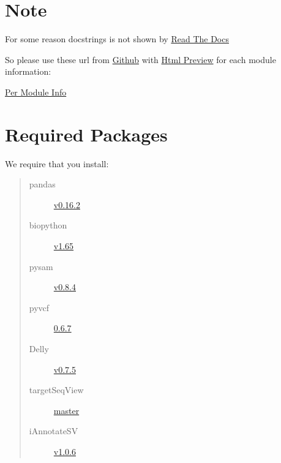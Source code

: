\documentclass[letterpaper,10pt,english]{sphinxmanual}
\begin{document}
\section{Note}
\label{iCallSV:note}
For some reason docstrings is not shown by \href{https:read-the-docs.readthedocs.io}{Read The Docs}

So please use these url from \href{https:github.com}{Github} with \href{https://htmlpreview.github.io/}{Html Preview} for each module information:

\href{https://htmlpreview.github.io/?https://raw.githubusercontent.com/rhshah/iCallSV/master/docs/\_build/html/iCallSV.html}{Per Module Info}


\section{Required Packages}
\label{iCallSV:required-packages}
We require that you install:
\begin{quote}\begin{description}
\item[{pandas}] \leavevmode
\href{http://pandas.pydata.org/}{v0.16.2}

\item[{biopython}] \leavevmode
\href{http://biopython.org/wiki/Main\_Page}{v1.65}

\item[{pysam}] \leavevmode
\href{https://pypi.python.org/pypi/pysam}{v0.8.4}

\item[{pyvcf}] \leavevmode
\href{https://pypi.python.org/pypi/PyVCF}{0.6.7}

\item[{Delly}] \leavevmode
\href{https://github.com/tobiasrausch/delly}{v0.7.5}

\item[{targetSeqView}] \leavevmode
\href{https://github.com/Eitan177/targetSeqView}{master}

\item[{iAnnotateSV}] \leavevmode
\href{https://github.com/rhshah/iAnnotateSV/tree/1.0.5}{v1.0.6}

\end{description}\end{quote}
\end{document}
